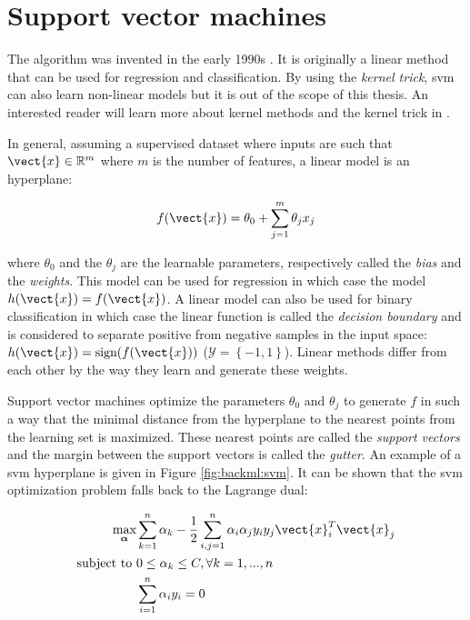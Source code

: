 \section{Support vector machines}
\label{sec:backml:svm}

The  algorithm was invented in the early 1990s \parencite{boser1992training}. It is originally a linear method that can be used for regression and classification. By using the \textit{kernel trick}, \acrshort{svm} can also learn non-linear models but it is out of the scope of this thesis. An interested reader will learn more about kernel methods and the kernel trick in \parencite{friedman2017elements}.

In general, assuming a supervised dataset where inputs are such that $\vect{x} \in \mathbb{R}^m$ where $m$ is the number of features, a linear model is an hyperplane:

\begin{equation}
\label{eqn:backml:linearmodel}
f(\vect{x}) = \theta_0 + \sum_{j=1}^m \theta_j x_j  
\end{equation}

where $\theta_0$ and the $\theta_j$ are the learnable parameters, respectively called the \textit{bias} and the \textit{weights}. This model can be used for regression in which case the model $h(\vect{x}) = f(\vect{x})$. A linear model can also be used for binary classification in which case the linear function is called the \textit{decision boundary} and is considered to separate positive from negative samples in the input space: $h(\vect{x}) = \text{sign}(f(\vect{x}))$ (\ie $\mathcal{Y} = \left\{-1, 1\right\}$). Linear methods differ from each other by the way they learn and generate these weights.

Support vector machines optimize the parameters $\theta_0$ and $\theta_j$ to generate $f$ in such a way that the minimal distance from the hyperplane to the nearest points from the learning set is maximized. These nearest points are called the \textit{support vectors} and the margin between the support vectors is called the \textit{gutter}. An example of a \acrshort{svm} hyperplane is given in Figure \ref{fig:backml:svm}. It can be shown that the \acrshort{svm} optimization problem falls back to the Lagrange dual:
 
\begin{align}
\label{eqn:backml:svmoptimizationproblem}
\underset{\boldsymbol{\alpha}}{\text{max}}& \sum_{k=1}^n \alpha_k - \frac{1}{2} \sum_{i,j=1}^n \alpha_i\alpha_j y_i y_j \vect{x}_i^T \vect{x}_j \\
\text{subject to}~& 0 \leq \alpha_k \leq C, \forall k = 1, ..., n \\
& \sum_{i=1}^n \alpha_i y_i = 0
\end{align}

